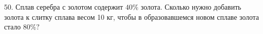50. Сплав серебра с золотом содержит $40\%$ золота. Сколько нужно добавить золота к слитку сплава весом 10 кг, чтобы в образовавшемся новом сплаве золота стало $80\%?$\\
